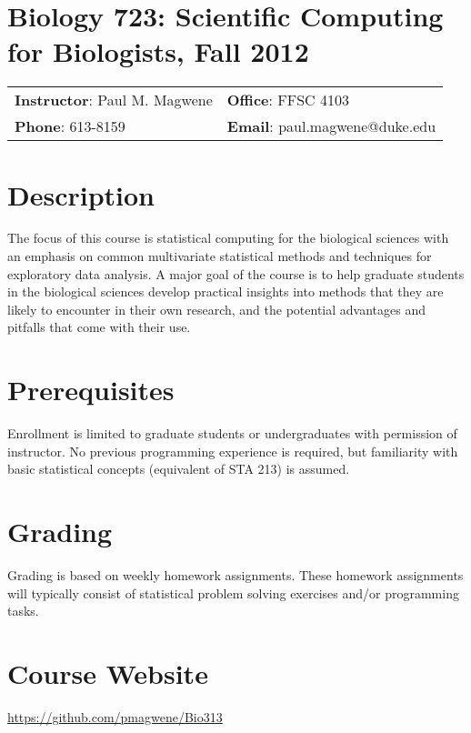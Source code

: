 \documentclass[11pt,letterpaper]{article}
\begin{document}
\section*{\centering Biology 723: Scientific Computing for Biologists, Fall 2012}
\begin{center}
\begin{tabular}{ll}
\textbf{Instructor}: Paul M. Magwene & \textbf{Office}: FFSC 4103\\
\textbf{Phone}: 613-8159 & \textbf{Email}: paul.magwene@duke.edu
\end{tabular}
\end{center}

\section*{Description}

The focus of this course is statistical computing for the biological sciences with an emphasis on common multivariate statistical methods and techniques for exploratory data analysis. A major goal of the course is to help graduate students in the biological sciences develop practical insights into methods that they are likely to encounter in their own research, and the potential advantages and pitfalls that come with their use. 

\section*{Prerequisites}

Enrollment is limited to graduate students or undergraduates with permission of instructor. No previous programming experience is required, but familiarity with basic statistical concepts (equivalent of STA 213) is assumed. 

\section*{Grading}
Grading is based on weekly homework assignments. These homework assignments will typically consist of statistical problem solving exercises and/or programming tasks.

\section*{Course Website}

\href{https://github.com/pmagwene/Bio313}{https://github.com/pmagwene/Bio313}
\end{document}
